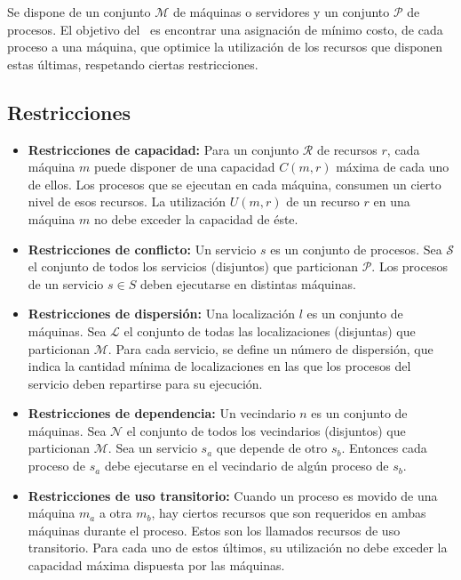 Se dispone de un conjunto $\mathcal{M}$ de máquinas o servidores y un conjunto $\mathcal{P}$ de procesos. El objetivo del \mrp\ es encontrar una asignación de mínimo costo, de cada proceso a una máquina, que optimice la utilización de los recursos que disponen estas últimas, respetando ciertas restricciones. 
\subsection{Restricciones}

\begin{itemize}
	
	\item \textbf{Restricciones de capacidad:} Para un conjunto $\mathcal{R}$ de recursos $r$, cada máquina $m$ puede disponer de una capacidad $C(m,r)$ máxima de cada uno de ellos. Los procesos que se ejecutan en cada máquina, consumen un cierto nivel de esos recursos. La utilización $U(m,r)$ de un recurso $r$ en una máquina $m$ no debe exceder la capacidad de éste. 
	
	\item \textbf{Restricciones de conflicto:} Un servicio $s$ es un conjunto de procesos. Sea $\mathcal{S}$ el conjunto de todos los servicios (disjuntos) que particionan $\mathcal{P}$. Los procesos de un servicio $s \in S$ deben ejecutarse en distintas máquinas.
	
	\item \textbf{Restricciones de dispersión:} Una localización $l$ es un conjunto de máquinas. Sea $\mathcal{L}$ el conjunto de todas las localizaciones (disjuntas) que particionan $\mathcal{M}$. Para cada servicio, se define un número de dispersión, que indica la cantidad mínima de localizaciones en las que los procesos del servicio deben repartirse para su ejecución. 
	
	\item \textbf{Restricciones de dependencia:} Un vecindario $n$ es un conjunto de máquinas. Sea $\mathcal{N}$ el conjunto de todos los vecindarios (disjuntos) que particionan $\mathcal{M}$. Sea un servicio $s_a$ que depende de otro $s_b$. Entonces cada proceso de $s_a$ debe ejecutarse en el vecindario de algún proceso de $s_b$.
	
	\item \textbf{Restricciones de uso transitorio:} Cuando un proceso es movido de una máquina $m_a$ a otra $m_b$, hay ciertos recursos que son requeridos en ambas máquinas durante el proceso. Estos son los llamados recursos de uso transitorio. Para cada uno de estos últimos, su utilización no debe exceder la capacidad máxima dispuesta por las máquinas.
	
\end{itemize}

